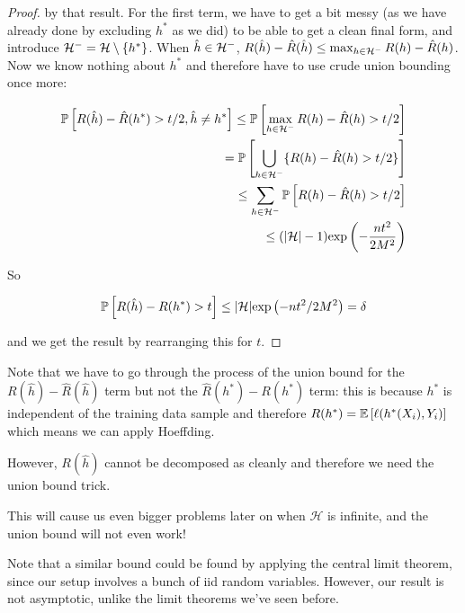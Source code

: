 \documentclass[11pt]{scrartcl}
\begin{document}
\begin{theorem}
\begin{proof}
by that result. For the first term, we have to get a bit messy (as we have already done by excluding $h^*$ as we did) to be able to get a clean final form, and introduce $\mathcal{H}^- = \mathcal{H} \setminus \{ h^* \}$. When $\hat{h} \in \mathcal{H}^-$,  $R(\hat{h}) - \hat{R}(\hat{h}) \le \max_{h \in \mathcal{H}^-} R(h) - \hat{R}(h)$. Now we know nothing about $h^*$ and therefore have to use crude union bounding once more:

\begin{align}
    \mathbb{P} \left[ R(\hat{h}) - \hat{R}(h^*) > t/2, \hat{h} \neq h^* \right] \le \mathbb{P} \left[ \max_{h \in \mathcal{H}^-} R(h) - \hat{R}(h) > t/2 \right] \\
    = \mathbb{P} \left[ \bigcup_{h \in \mathcal{H}^-} \{ R(h) - \hat{R}(h) > t/2 \} \right] \\
    \le \sum_{h \in \mathcal{H}^-} \mathbb{P} \left[ R(h) - \hat{R}(h) > t/2 \right] \\
    \le (|\mathcal{H}|-1) \text{exp} \left( -\frac{nt^2}{2M^2} \right)
\end{align}


So

\begin{equation}
    \mathbb{P} \left[ R(\hat{h}) - R(h^*) > t \right] \le |\mathcal{H}| \text{exp} \left( -nt^2 / 2M^2 \right) = \delta
\end{equation}

and we get the result by rearranging this for $t$.
\end{proof}
\label{Finite hypothesis class bound}
\end{theorem}

\begin{arthurnote*}
Note that we have to go through the process of the union bound for the $R(\hat{h})-\hat{R}(\hat{h})$ term but not the $\hat{R
}(h^*)-R(h^*)$ term: this is because $h^*$ is independent of the training data sample and therefore $R(h^*) = \mathbb{E} \left[  \ell ( h^*(X_i) , Y_i )  \right]$ which means we can apply Hoeffding.

However, $R(\hat{h})$ cannot be decomposed as cleanly and therefore we need the union bound trick.

This will cause us even bigger problems later on when $\mathcal{H}$ is infinite, and the union bound will not even work!
\end{arthurnote*}

Note that a similar bound could be found by applying the central limit theorem, since our setup involves a bunch of iid random variables. However, our result is not asymptotic, unlike the limit theorems we've seen before.
\end{document}
